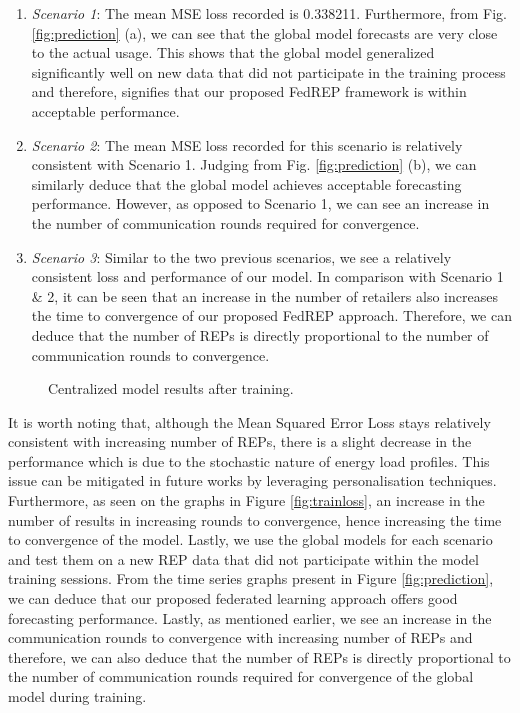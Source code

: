\documentclass[10pt, conference]{IEEEtran}
\begin{document}
\begin{enumerate}
    \item \textit{Scenario 1}: The mean MSE loss recorded is 0.338211. Furthermore, from Fig. \ref{fig:prediction} (a), we can see that the global model forecasts are very close to the actual usage. This shows that the global model generalized significantly well on new data that did not participate in the training process and therefore, signifies that our proposed FedREP framework is within acceptable performance.
    \item \textit{Scenario 2}: The mean MSE loss recorded for this scenario is relatively consistent with Scenario 1. Judging from Fig. \ref{fig:prediction} (b), we can similarly deduce that the global model achieves acceptable forecasting performance. However, as opposed to Scenario 1, we can see an increase in the number of communication rounds required for convergence.
    
    \item \textit{Scenario 3}: Similar to the two previous scenarios, we see a relatively consistent loss and performance of our model. In comparison with Scenario 1 \& 2, it can be seen that an increase in the number of retailers also increases the time to convergence of our proposed FedREP approach. Therefore, we can deduce that the number of REPs is directly proportional to the number of communication rounds to convergence.
    
\end{enumerate}

\begin{figure}
    \centering
    \qquad
    \caption{Centralized model results after training.}%
    \label{fig:predictioncentra}
\end{figure}

It is worth noting that, although the Mean Squared Error Loss stays relatively consistent with increasing number of REPs, there is a slight decrease in the performance which is due to the stochastic nature of energy load profiles. This issue can be mitigated in future works by leveraging personalisation techniques. Furthermore, as seen on the graphs in Figure \ref{fig:trainloss}, an increase in the number of results in increasing rounds to convergence, hence increasing the time to convergence of the model. Lastly, we use the global models for each scenario and test them on a new REP data that did not participate within the model training sessions. From the time series graphs present in Figure \ref{fig:prediction}, we can deduce that our proposed federated learning approach offers good forecasting performance. Lastly, as mentioned earlier, we see an increase in the communication rounds to convergence with increasing number of REPs and therefore, we can also deduce that the number of REPs is directly proportional to the number of communication rounds required for convergence of the global model during training. 
\end{document}
